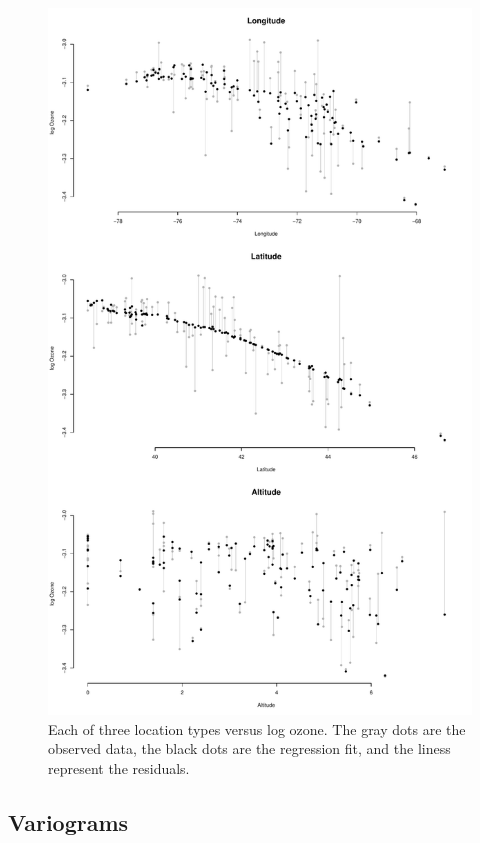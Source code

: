 \documentclass[12pt]{article}
\begin{document}
\begin{figure}
\begin{center}
\includegraphics[scale=0.5]{figs/regression.pdf}
\end{center}
\caption{Each of three location types versus log ozone. The gray dots are the observed data, the black dots are the regression fit, and the liness represent the residuals.}
\end{figure}

\newpage

\subsection*{Variograms}
\end{document}
